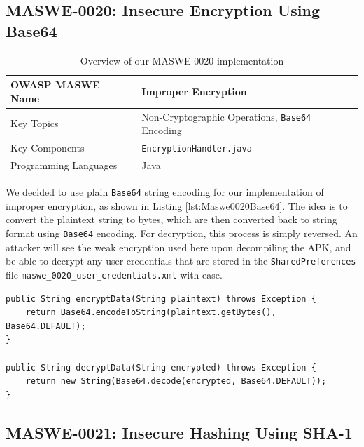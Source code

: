 \subsection{MASWE-0020: Insecure Encryption Using Base64}

\begin{table}[H]
\centering
\renewcommand{\arraystretch}{1.3}
\begin{tabular}{p{5cm} p{8cm}} 
\toprule
OWASP MASWE Name & Improper Encryption \\ 
\midrule
Key Topics & Non-Cryptographic Operations, \texttt{Base64} Encoding \\
Key Components & \texttt{EncryptionHandler.java} \\
Programming Languages & Java \\ 
\bottomrule
\end{tabular}
\caption{Overview of our MASWE-0020 implementation}
\label{tab:maswe-0020}
\end{table}

We decided to use plain \texttt{Base64} string encoding for our implementation of improper encryption, as shown in Listing \ref{lst:Maswe0020Base64}. The idea is to convert the plaintext string to bytes, which are then converted back to string format using \texttt{Base64} encoding. For decryption, this process is simply reversed. An attacker will see the weak encryption used here upon decompiling the APK, and be able to decrypt any user credentials that are stored in the \texttt{SharedPreferences} file \texttt{maswe\_0020\_user\_credentials.xml} with ease.

\begin{lstlisting}[style=JavaStyle, float=tbh, captionpos=b, caption={\texttt{Base64} for encrypting and decrypting user credentials}, label=lst:Maswe0020Base64]
public String encryptData(String plaintext) throws Exception {
    return Base64.encodeToString(plaintext.getBytes(), Base64.DEFAULT);
}

public String decryptData(String encrypted) throws Exception {
    return new String(Base64.decode(encrypted, Base64.DEFAULT));
}
\end{lstlisting}


\subsection{MASWE-0021: Insecure Hashing Using SHA-1}
\label{subsec:maswe_0021}

\vspace{-1pt}

